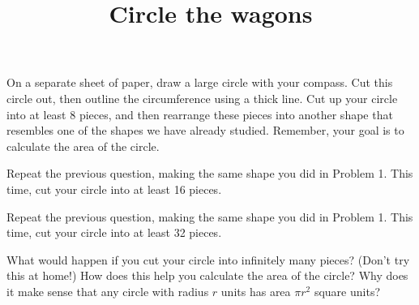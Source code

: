 \documentclass[nooutcomes,noauthor, handout]{ximera}
\title{Circle the wagons}
\begin{document}
\begin{abstract}
\end{abstract}
\maketitle



\begin{problem}
On a separate sheet of paper, draw a large circle with your compass.  Cut this circle out, then outline the circumference using a thick line.  Cut up your circle into at least 8 pieces, and then rearrange these pieces into another shape that resembles one of the shapes we have already studied.  Remember, your goal is to calculate the area of the circle.


\end{problem}

\begin{problem}
Repeat the previous question, making the same shape you did in Problem 1.  This time, cut your circle into at least 16 pieces.


\end{problem}

\begin{problem}
Repeat the previous question, making the same shape you did in Problem 1.  This time, cut your circle into at least 32 pieces.
\end{problem}

\begin{problem}
What would happen if you cut your circle into infinitely many pieces?  (Don't try this at home!)  How does this help you calculate the area of the circle?  Why does it make sense that any circle with radius $r$ units has area $\pi r^2$ square units?


\end{problem}


\newpage
\end{document}

